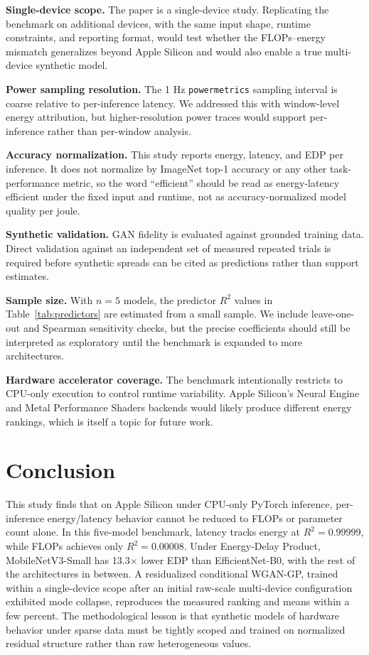 \documentclass{svproc}
\begin{document}
\textbf{Single-device scope.} The paper is a single-device study. Replicating
the benchmark on additional devices, with the same input shape, runtime
constraints, and reporting format, would test whether the FLOPs--energy
mismatch generalizes beyond Apple Silicon and would also enable a true
multi-device synthetic model.

\textbf{Power sampling resolution.} The 1 Hz \texttt{powermetrics} sampling
interval is coarse relative to per-inference latency. We addressed this with
window-level energy attribution, but higher-resolution power traces would
support per-inference rather than per-window analysis.

\textbf{Accuracy normalization.} This study reports energy, latency, and EDP
per inference. It does not normalize by ImageNet top-1 accuracy or any other
task-performance metric, so the word ``efficient'' should be read as
energy-latency efficient under the fixed input and runtime, not as
accuracy-normalized model quality per joule.

\textbf{Synthetic validation.} GAN fidelity is evaluated against grounded
training data. Direct validation against an independent set of measured
repeated trials is required before synthetic spreads can be cited as
predictions rather than support estimates.

\textbf{Sample size.} With $n = 5$ models, the predictor $R^2$ values in
Table~\ref{tab:predictors} are estimated from a small sample. We include
leave-one-out and Spearman sensitivity checks, but the precise coefficients
should still be interpreted as exploratory until the benchmark is expanded to
more architectures.

\textbf{Hardware accelerator coverage.} The benchmark intentionally restricts
to CPU-only execution to control runtime variability. Apple Silicon's Neural
Engine and Metal Performance Shaders backends would likely produce different
energy rankings, which is itself a topic for future work.

\section{Conclusion}
This study finds that on Apple Silicon under CPU-only PyTorch inference,
per-inference energy/latency behavior cannot be reduced to FLOPs or parameter
count alone.
In this five-model benchmark, latency tracks energy at $R^2 = 0.99999$,
while FLOPs achieves only $R^2 = 0.00008$. Under Energy-Delay Product,
MobileNetV3-Small has 13.3$\times$ lower EDP than EfficientNet-B0, with the
rest of the architectures in between. A residualized conditional WGAN-GP,
trained within a single-device
scope after an initial raw-scale multi-device configuration exhibited mode
collapse, reproduces the measured ranking and means within a few percent.
The methodological lesson is that synthetic models of hardware behavior
under sparse data must be tightly scoped and trained on normalized residual
structure rather than raw heterogeneous values.
\end{document}
